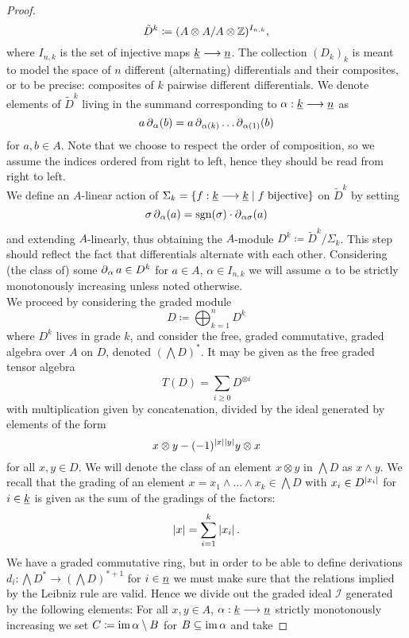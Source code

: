 \begin{prop}
\begin{proof}
$$\tilde{D}^k \coloneqq (A \otimes A / A \otimes \mathbb{Z}) ^ { I_{n,k} },$$
where $I_{n,k}$ is the set of injective maps $\underline{k} \longrightarrow \underline{n}$. The collection $(D_k)_k$ is meant to model the space of $n$ different (alternating) differentials and their composites, or to be precise: composites of $k$ pairwise different differentials. We denote elements of $\tilde{D}^k$ living in the summand corresponding to $\alpha: \underline{k} \longrightarrow \underline{n}$ as
\[a \operatorname{\partial}_\alpha (b) = a \operatorname{\partial}_{\alpha(k)} \ldots \operatorname{\partial}_{\alpha(1)} (b)\]%
for $a,b \in A$. Note that we choose to respect the order of composition, so we assume the indices ordered from right to left, hence they should be read from right to left.\\%
We define an $A$-linear action of $\Sigma_k = \{f: \underline{k} \longrightarrow \underline{k} \mid f \; \mathrm{bijective} \}$ on $\tilde{D}^k$ by setting%
$$\sigma \operatorname{\partial}_\alpha (a) = \operatorname{sgn}(\sigma) \cdot \operatorname{\partial}_{\alpha \sigma} (a)$$
and extending $A$-linearly, thus obtaining the $A$-module $D^k \coloneqq \tilde{D}^k/\Sigma_k$. This step should reflect the fact that differentials alternate with each other. Considering (the class of) some $\operatorname{\partial}_\alpha a \in D^k$ for $a \in A$, $\alpha \in I_{n,k}$ we will assume $\alpha$ to be strictly monotonously increasing unless noted otherwise.\\
We proceed by considering the graded module
\begin{equation*}
D \coloneqq \bigoplus_{k=1}^{n} D^k
\end{equation*}
where $D^k$ lives in grade $k$, and consider the free, graded commutative, graded algebra over $A$ on $D$, denoted $(\bigwedge D)^*$. It may be given as the free graded tensor algebra
\begin{equation*}
	T (D) = \sum_{i \geq 0} D^{\otimes i}
\end{equation*}
with multiplication given by concatenation, divided by the ideal generated by elements of the form
\begin{equation*}
	x \otimes y - (-1)^{\left\vert x\right\vert\left\vert y\right\vert} y \otimes x
\end{equation*}
for all $x,y \in D$. We will denote the class of an element $x \otimes y$ in $\bigwedge D$ as $x \wedge y$. We recall that the grading of an element $x = x_1 \wedge \ldots \wedge x_k \in \bigwedge D$ with $x_i \in D^{\left\vert x_i\right\vert}$ for $i \in \underline{k}$ is given as the sum of the gradings of the factors:
\begin{equation*}
	\left\vert x\right\vert = \sum_{i=1}^k \left\vert x_i\right\vert.
\end{equation*}
We have a graded commutative ring, but in order to be able to define derivations $d_i: \bigwedge D ^* \to (\bigwedge D)^{*+1}$ for $i \in \underline{n}$ we must make sure that the relations implied by the Leibniz rule are valid. Hence we divide out the graded ideal $\mathcal{I}$ generated by the following elements: For all $x,y \in A$, $\alpha: \underline{k} \longrightarrow \underline{n}$ strictly monotonously increasing we set $C \coloneqq \operatorname{im} \alpha \setminus B$ for $B \subseteq \operatorname{im} \alpha$ and take

\end{proof}
\end{prop}
